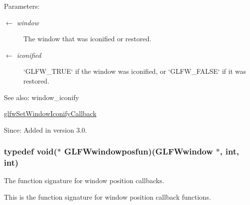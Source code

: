 \begin{Desc}
\item[Parameters:]
\begin{description}
\item[\mbox{$\leftarrow$} {\em window}]The window that was iconified or restored. \item[\mbox{$\leftarrow$} {\em iconified}]`GLFW\_\-TRUE` if the window was iconified, or `GLFW\_\-FALSE` if it was restored.\end{description}
\end{Desc}
\begin{Desc}
\item[See also:]window\_\-iconify 

\hyperlink{group__window_g17cd86946117b56c76397530900519db}{glfwSetWindowIconifyCallback}\end{Desc}
\begin{Desc}
\item[Since:]Added in version 3.0. \end{Desc}
\hypertarget{group__window_g1c36e52549efd47790eb3f324da71924}{
\subsubsection[GLFWwindowposfun]{\setlength{\rightskip}{0pt plus 5cm}typedef void($\ast$  {\bf GLFWwindowposfun})({\bf GLFWwindow} $\ast$, int, int)}}
\label{group__window_g1c36e52549efd47790eb3f324da71924}


The function signature for window position callbacks. 

This is the function signature for window position callback functions.

